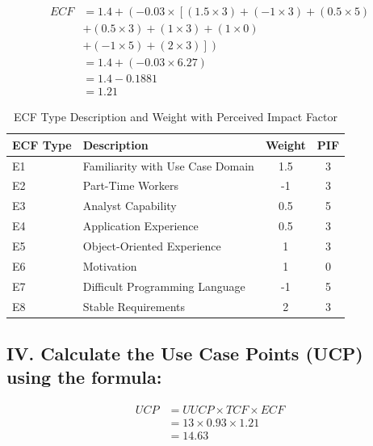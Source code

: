 \documentclass[english,12pt,a4paper]{report}
\begin{document}
	\begin{equation}
		\begin{aligned}
			ECF &= 1.4 + \left(-0.03 \times \left[(1.5 \times 3) + (-1 	\times 3) + (0.5 \times 5) \right.\right. \\
			&\left.\left. + (0.5 \times 3) + (1 \times 3) + (1 \times 0) 	\right. \right. \\
			&\left.\left. + (-1 \times 5) + (2 \times 3)\right] \right) \\
			&= 1.4 + \left(-0.03 \times 6.27\right) \\
			&= 1.4 - 0.1881 \\
			&= 1.21
		\end{aligned}
	\end{equation}
	
	\begin{table}[htbp]
		\centering
		\begin{tabular}{@{}llcc@{}}
			\toprule
			ECF Type & Description & Weight & PIF \\ 
			\midrule
			E1 & Familiarity with Use Case Domain & 1.5 & 3 \\ 
			E2 & Part-Time Workers & -1 & 3 \\ 
			E3 & Analyst Capability & 0.5 & 5 \\ 
			E4 & Application Experience & 0.5 & 3 \\ 
			E5 & Object-Oriented Experience & 1 & 3 \\ 
			E6 & Motivation & 1 & 0 \\ 
			E7 & Difficult Programming Language & -1 & 5 \\ 
			E8 & Stable Requirements & 2 & 3 \\ 
			\bottomrule
		\end{tabular}
		\caption{ECF Type Description and Weight with Perceived Impact Factor}
		\label{tab:ecf_table}
	\end{table}
	
	
	\subsection*{IV. Calculate the Use Case Points (UCP) using the formula:}
	\begin{equation}
		\begin{aligned}
			UCP &= UUCP \times TCF \times ECF \\
			&= 13 \times 0.93 \times 1.21 \\
			&= 14.63 
		\end{aligned}
	\end{equation}
	
\end{document}
